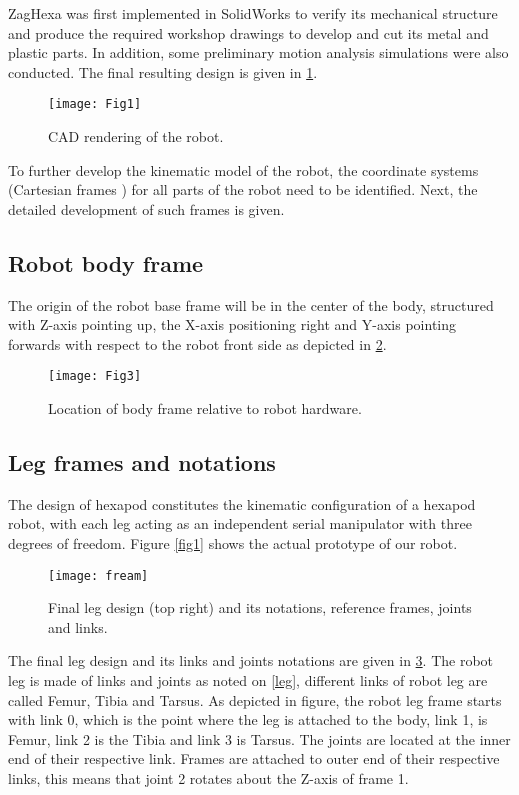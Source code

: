 
ZagHexa was first implemented in SolidWorks to verify its mechanical structure and produce the required workshop drawings to develop and cut its metal and plastic parts. In addition, some preliminary motion analysis simulations were also conducted. The final resulting design is given in \ref{CAD}.
\begin{figure}[h]
	\centering
	\texttt{[image: Fig1]}
	\caption{ CAD rendering of the robot.}
	\label{CAD}
\end{figure}
To further develop the kinematic model of the robot, the coordinate systems (Cartesian frames \cite{28}) for all parts of the robot need to be identified. Next, the detailed development of such frames is given.
\subsection{Robot body frame}
The origin of the robot base frame will be in the center of the body, structured with Z-axis pointing up, the X-axis positioning right and Y-axis pointing forwards with respect to the robot front side as depicted in \ref{Loc}.

\begin{figure}[h]
	\centering
	\texttt{[image: Fig3]}
	\caption{ Location of body frame relative to robot hardware.}
	\label{Loc}
\end{figure}
\subsection{Leg frames and notations}
The design of hexapod constitutes the kinematic configuration of a hexapod robot, with each leg acting as an independent serial manipulator with three degrees of freedom. Figure \ref{fig1} shows the actual prototype of our robot.

\begin{figure}[h]
	\centering
	\texttt{[image: fream]}
	\caption{  Final leg design (top right) and its notations, reference frames, joints and links.}
	\label{fream}
\end{figure}

The final leg design and its links and joints notations are given in \ref{fream}. The robot leg is made of links and joints as noted on \ref{leg}, different links of robot leg are called Femur, Tibia and Tarsus. As depicted in figure, the robot leg frame starts with link 0, which is the point where the leg is attached to the body, link 1, is Femur, link 2 is the Tibia and link 3 is Tarsus. The joints are located at the inner end of their respective link. Frames are attached to outer end of their respective links, this means that joint 2 rotates about the Z-axis of frame 1.

